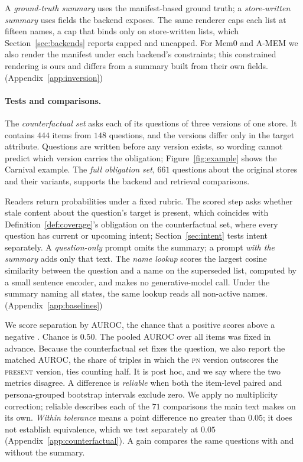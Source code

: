 \documentclass{article}
\newcommand{\present}{\textsc{present}}
\newcommand{\pn}{\textsc{pn}}
\begin{document}
A \emph{ground-truth summary} uses the manifest-based ground truth; a \emph{store-written summary} uses fields the backend exposes. The same renderer caps each list at fifteen names, a cap that binds only on store-written lists, which Section~\ref{sec:backends} reports capped and uncapped. For Mem0 and A-MEM we also render the manifest under each backend's constraints; this constrained rendering is ours and differs from a summary built from their own fields. (Appendix~\ref{app:inversion})

\paragraph{Tests and comparisons.}
The \emph{counterfactual set} asks each of its questions of three versions of one store. It contains $444$ items from $148$ questions, and the versions differ only in the target attribute. Questions are written before any version exists, so wording cannot predict which version carries the obligation; Figure~\ref{fig:example} shows the Carnival example. The \emph{full obligation set}, $661$ questions about the original stores and their variants, supports the backend and retrieval comparisons.

Readers return probabilities under a fixed rubric. The scored step asks whether stale content about the question's target is present, which coincides with Definition~\ref{def:coverage}'s obligation on the counterfactual set, where every question has current or upcoming intent; Section~\ref{sec:intent} tests intent separately. A \emph{question-only} prompt omits the summary; a prompt \emph{with the summary} adds only that text. The \emph{name lookup} scores the largest cosine similarity between the question and a name on the superseded list, computed by a small sentence encoder, and makes no generative-model call. Under the summary naming all states, the same lookup reads all non-active names. (Appendix~\ref{app:baselines})

We score separation by AUROC, the chance that a positive scores above a negative \citep{hanley1982}. Chance is $0.50$. The pooled AUROC over all items was fixed in advance. Because the counterfactual set fixes the question, we also report the matched AUROC, the share of triples in which the \pn{} version outscores the \present{} version, ties counting half. It is post hoc, and we say where the two metrics disagree. A difference is \emph{reliable} when both the item-level paired and persona-grouped bootstrap intervals exclude zero. We apply no multiplicity correction; reliable describes each of the $71$ comparisons the main text makes on its own. \emph{Within tolerance} means a point difference no greater than $0.05$; it does not establish equivalence, which we test separately at $0.05$ (Appendix~\ref{app:counterfactual}). A gain compares the same questions with and without the summary.
\end{document}
